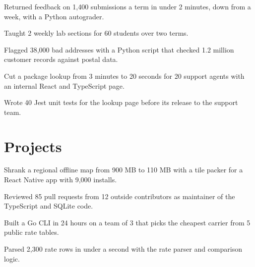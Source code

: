 \documentclass{resume}
\begin{document}
\begin{bullets}
  \item Returned feedback on 1,400 submissions a term in under 2 minutes, down from a week, with a Python autograder.
  \item Taught 2 weekly lab sections for 60 students over two terms.
\end{bullets}

\begin{bullets}
  \item Flagged 38,000 bad addresses with a Python script that checked 1.2 million customer records against postal data.
  \item Cut a package lookup from 3 minutes to 20 seconds for 20 support agents with an internal React and TypeScript page.
  \item Wrote 40 Jest unit tests for the lookup page before its release to the support team.
\end{bullets}

\section{Projects}
\begin{bullets}
  \item Shrank a regional offline map from 900 MB to 110 MB with a tile packer for a React Native app with 9,000 installs.
  \item Reviewed 85 pull requests from 12 outside contributors as maintainer of the TypeScript and SQLite code.
\end{bullets}
\begin{bullets}
  \item Built a Go CLI in 24 hours on a team of 3 that picks the cheapest carrier from 5 public rate tables.
  \item Parsed 2,300 rate rows in under a second with the rate parser and comparison logic.
\end{bullets}
\end{document}
